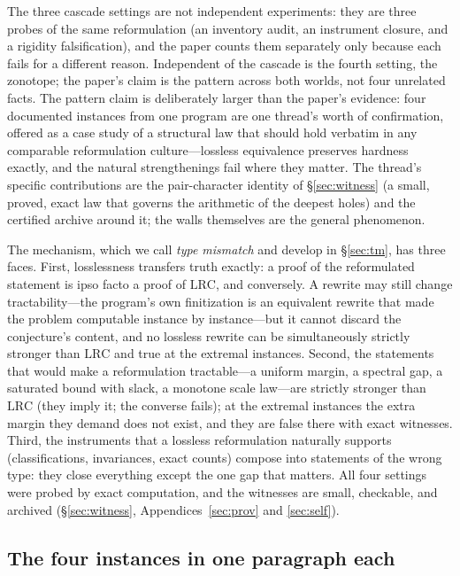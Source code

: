 \documentclass[11pt,a4paper]{article}
\numberwithin{equation}{section}
\theoremstyle{plain}
\theoremstyle{definition}
\theoremstyle{remark}
\newcommand{\lrc}{\mathrm{LRC}}
\begin{document}
The three cascade settings are not independent experiments: they are three
probes of the same reformulation (an inventory audit, an instrument
closure, and a rigidity falsification), and the paper counts them
separately only because each fails for a different reason. Independent of
the cascade is the fourth setting, the zonotope; the paper's claim is the
pattern across both worlds, not four unrelated facts. The pattern claim
is deliberately larger than the paper's evidence: four documented
instances from one program are one thread's worth of confirmation,
offered as a case study of a structural law that should hold verbatim in
any comparable reformulation culture---lossless equivalence preserves
hardness exactly, and the natural strengthenings fail where they matter.
The thread's specific contributions are the pair-character identity of
\S\ref{sec:witness} (a small, proved, exact law that governs the
arithmetic of the deepest holes) and the certified archive around it;
the walls themselves are the general phenomenon.

The mechanism, which we call \emph{type mismatch} and develop in
\S\ref{sec:tm}, has three faces. First, losslessness transfers truth
exactly: a proof of the reformulated statement is ipso facto a proof of
$\lrc$, and conversely. A rewrite may still change tractability---the
program's own finitization is an equivalent rewrite that made the problem
computable instance by instance---but it cannot discard the conjecture's
content, and no lossless rewrite can be simultaneously strictly stronger
than $\lrc$ and true at the extremal instances. Second, the statements
that would make a reformulation tractable---a uniform margin, a spectral
gap, a saturated bound with slack, a monotone scale law---are strictly
stronger than $\lrc$ (they imply it; the converse fails); at the extremal
instances the extra margin they demand does not exist, and they are false
there with exact witnesses. Third, the instruments that a lossless
reformulation naturally supports (classifications, invariances, exact
counts) compose into statements of the wrong type: they close everything
except the one gap that matters. All four settings were probed by exact
computation, and the witnesses are small, checkable, and archived
(\S\ref{sec:witness}, Appendices~\ref{sec:prov} and \ref{sec:self}).

\subsection{The four instances in one paragraph each}
\end{document}
